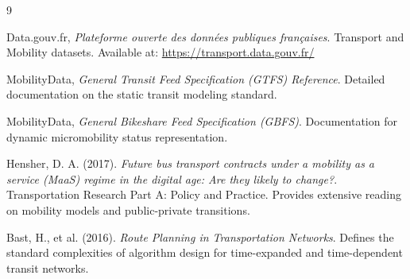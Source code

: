 \documentclass[12pt,a4paper]{article}
\begin{document}
\begin{thebibliography}{9}

Data.gouv.fr, \textit{Plateforme ouverte des données publiques françaises}. Transport and Mobility datasets. Available at: \url{https://transport.data.gouv.fr/}

MobilityData, \textit{General Transit Feed Specification (GTFS) Reference}. Detailed documentation on the static transit modeling standard.

MobilityData, \textit{General Bikeshare Feed Specification (GBFS)}. Documentation for dynamic micromobility status representation.

Hensher, D. A. (2017). \textit{Future bus transport contracts under a mobility as a service (MaaS) regime in the digital age: Are they likely to change?}. Transportation Research Part A: Policy and Practice. Provides extensive reading on mobility models and public-private transitions.

Bast, H., et al. (2016). \textit{Route Planning in Transportation Networks}. Defines the standard complexities of algorithm design for time-expanded and time-dependent transit networks.

\end{thebibliography}
\end{document}
